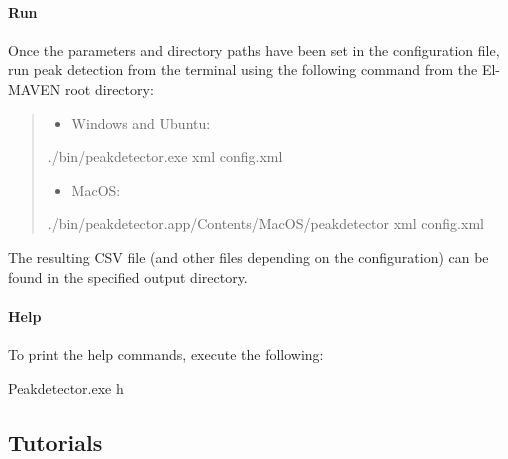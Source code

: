 \documentclass[letterpaper,10pt,english,openany,oneside]{sphinxmanual}
\begin{document}
\paragraph{Run}
\label{\detokenize{IntroductiontoElMAVENCLI:run}}
Once the parameters and directory paths have been set in the configuration file, run peak detection from the terminal using the following command from the El-MAVEN root directory:
\begin{quote}
\begin{itemize}
\item {} 
Windows and Ubuntu:

\end{itemize}

%
\begin{sphinxVerbatim}[commandchars=\\\{\}]
\PYGZdl{} ./bin/peakdetector.exe \PYGZhy{}\PYGZhy{}xml config.xml
\end{sphinxVerbatim}
\begin{itemize}
\item {} 
MacOS:

\end{itemize}

%
\begin{sphinxVerbatim}[commandchars=\\\{\}]
\PYGZdl{} ./bin/peakdetector.app/Contents/MacOS/peakdetector \PYGZhy{}\PYGZhy{}xml config.xml
\end{sphinxVerbatim}
\end{quote}

The resulting CSV file (and other files depending on the configuration) can be found in the specified output directory.


\paragraph{Help}
\label{\detokenize{IntroductiontoElMAVENCLI:help}}
To print the help commands, execute the following:

%
\begin{sphinxVerbatim}[commandchars=\\\{\}]
\PYGZdl{} Peakdetector.exe \PYGZhy{}h
\end{sphinxVerbatim}


\subsection{Tutorials}
\label{\detokenize{Documentation:tutorials}}
\end{document}
